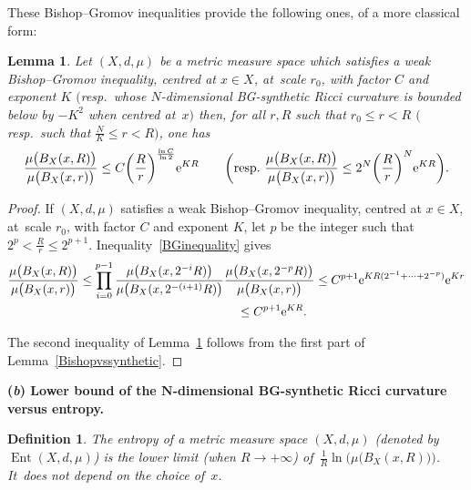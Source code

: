\documentclass[10pt,a4paper]{amsart}
\numberwithin{equation}{section}
\newtheorem{Lemma}[theor]{Lemma}
\newtheorem{defi}[theor]{Definition}
\newcommand{\Ent}{\operatorname{Ent}}
\begin{document}
These Bishop--Gromov inequalities provide the following ones, of a more classical form:

\begin{Lemma}\label{Bishopclassic}
Let $(X,d,\mu)$ be a metric measure space which satisfies a weak Bishop--Gromov ineq\-uality, centred at $x\in X$, at~scale $r_0$, with factor $C$
and exponent $K$ $($resp.\ whose $N$-dimensional BG-synthetic Ricci curvature is bounded below by $-K^2$ when centred at~$x)$ then, for all $r, R$
such that $ r_0 \le r < R$ $($resp.\ such that $\frac{N}{K} \le r < R)$, one has
\begin{gather*}
\dfrac{\mu \big( B_X(x, R)\big)}{\mu \big( B_X(x,r)\big)}
\le C \bigg(\dfrac{R}{r}\bigg)^{\frac{\ln C}{\ln 2}} {\rm e}^{K R}\qquad
\bigg(\text{resp.\ } \dfrac{\mu \big( B_X(x, R)\big)}{\mu \big( B_X(x,r)\big)} \le 2^N \bigg(\dfrac{R}{r}\bigg)^N {\rm e}^{KR}\bigg).
\end{gather*}
\end{Lemma}

\begin{proof} If $(X,d,\mu)$ satisfies a weak Bishop--Gromov inequality, centred at $x\in X$, at~scale $r_0$, with factor $C$ and exponent $K$,
let $p$ be the integer such that $2^p < \frac{R}{r} \le 2^{p+1}$. Inequality~\eqref{BGinequality} gives
\begin{gather*}
\dfrac{\mu \big( B_X(x, R)\big)}{\mu \big( B_X(x,r)\big)} \le \prod_{i=0}^{p-1} \dfrac{\mu \big( B_X(x, 2^{- i}R)\big)}{\mu \big( B_X(x, 2^{-(i+1)}R)\big)}
 \dfrac{\mu \big( B_X(x, 2^{- p}R)\big)}{\mu \big( B_X(x,r)\big)}
\le C^{p+1} {\rm e}^{KR (2^{-1}+ \cdots + 2^{- p})} {\rm e}^{K r}
\\ \hphantom{\dfrac{\mu \big( B_X(x, R)\big)}{\mu \big( B_X(x,r)\big)}}
{}\le C^{p+1} {\rm e}^{K R}.
\end{gather*}

The second inequality of Lemma~\ref{Bishopclassic} follows from the first part of Lemma~\ref{Bishopvssynthetic}.
\end{proof}

\medskip\noindent
{\bf (\emph{b}) Lower bound of the $\boldsymbol N$-dimensional BG-synthetic Ricci curvature versus entropy.}
\begin{defi}\label{Entropies0}
The entropy of a metric measure space $ (X,d, \mu) $ (denoted by $ \Ent (X,d, \mu) $) is the lower limit (when $ R \to +\infty $)
of~$ \frac{1}{R} \ln \big( \mu \big( B_X (x, R)\big) \big) $. It~does not depend on the choice of~$x$.
\end{defi}
\end{document}
